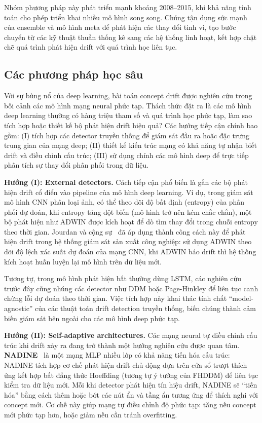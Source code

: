 Nhóm phương pháp này phát triển mạnh khoảng 2008–2015, khi khả năng tính toán cho phép triển khai nhiều mô hình song song. Chúng tận
dụng sức mạnh của ensemble và mô hình meta để phát hiện các thay đổi tinh vi, tạo bước chuyển từ các kỹ thuật thuần thống kê sang các
hệ thống linh hoạt, kết hợp chặt chẽ quá trình phát hiện drift với quá trình học liên tục.

\subsection{Các phương pháp học sâu}
Với sự bùng nổ của deep learning, bài toán concept drift được nghiên cứu trong bối cảnh các mô hình mạng
neural phức tạp. Thách thức đặt ra là các mô hình deep learning thường có hàng triệu tham số và quá trình học phức tạp, làm sao tích
hợp hoặc thiết kế bộ phát hiện drift hiệu quả? Các hướng tiếp cận chính bao gồm: (I) tích hợp các detector truyền thống để giám sát đầu
ra hoặc đặc trưng trung gian của mạng deep; (II) thiết kế kiến trúc mạng có khả năng tự nhận biết drift và điều chỉnh cấu trúc; (III) sử
dụng chính các mô hình deep để trực tiếp phân tích sự thay đổi phân phối trong dữ liệu.

\textbf{Hướng (I): External detectors.} Cách tiếp cận phổ biến là gắn các bộ phát hiện drift cổ điển vào pipeline của mô hình deep learning.
Ví dụ, trong giám sát mô hình CNN phân loại ảnh, có thể theo dõi độ bất định (entropy) của phân phối dự đoán, khi entropy tăng đột
biến (mô hình trở nên kém chắc chắn), một bộ phát hiện như ADWIN được kích hoạt để dò tìm thay đổi trong chuỗi entropy theo thời gian.
Jourdan và cộng sự~\cite{jourdan2023process} đã áp dụng thành công cách này để phát hiện drift trong hệ thống giám sát sản xuất công nghiệp: sử dụng ADWIN theo
dõi độ lệch xác suất dự đoán của mạng CNN, khi ADWIN báo drift thì hệ thống kích hoạt huấn luyện lại mô hình trên dữ liệu mới.

Tương tự, trong mô hình phát hiện bất thường dùng LSTM, các nghiên cứu trước đây cũng nhúng các detector như DDM hoặc Page-Hinkley để liên tục canh chừng lỗi dự đoán theo thời gian. Việc tích hợp này khai thác tính chất ``model-agnostic'' của các thuật toán drift detection truyền thống, biến chúng thành cảm biến giám sát bên ngoài cho các mô hình deep phức tạp.

\textbf{Hướng (II): Self-adaptive architectures.} Các mạng neural tự điều chỉnh cấu trúc khi drift xảy ra đang trở thành một hướng nghiên cứu được quan tâm. \textbf{NADINE}~\cite{pratama2019automatic} là một mạng MLP nhiều lớp có khả năng tiến hóa cấu trúc: NADINE tích hợp cơ chế phát hiện drift chủ động dựa trên cửa sổ trượt thích ứng kết hợp bất đẳng thức Hoeffding (tương tự ý tưởng của FHDDM) để liên tục kiểm tra dữ liệu mới. Mỗi khi detector phát hiện tín hiệu drift, NADINE sẽ ``tiến hóa'' bằng cách thêm hoặc bớt các nút ẩn và tầng ẩn tương ứng để thích nghi với concept mới. Cơ chế này giúp mạng tự điều chỉnh độ phức tạp: tăng nếu concept mới phức tạp hơn, hoặc giảm nếu cần tránh overfitting.

